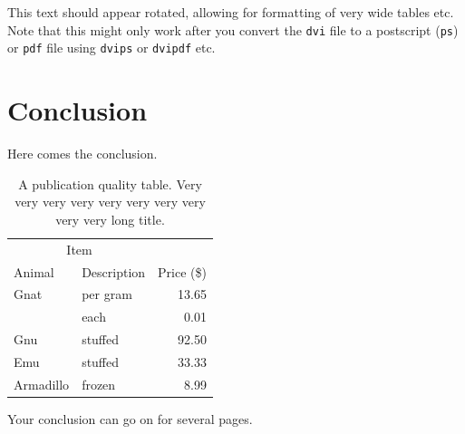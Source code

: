 \documentclass[msc,oneside]{ubcthesis}%
\begin{document}
\begin{landscape}
  This text should appear rotated, allowing for formatting of very
  wide tables etc.  Note that this might only work after you convert
  the \texttt{dvi} file to a postscript (\texttt{ps}) or \texttt{pdf}
  file using \texttt{dvips} or \texttt{dvipdf} etc.
\end{landscape}

\chapter{Conclusion}
Here comes the conclusion.
\begin{table}[tbph]
\centering
\caption{A publication quality table. Very very very very very very very very very very long title.
\label{table:food1}}
\begin{tabular}{@{}llr@{}} \toprule 
\multicolumn{2}{c}{Item} \\ \cmidrule(r){1-2} 
Animal & Description & Price (\$)\\ \midrule 
Gnat & per gram & 13.65 \\ 
& each & 0.01 \\ 
Gnu & stuffed & 92.50 \\ 
Emu & stuffed & 33.33 \\ 
Armadillo & frozen & 8.99 \\ \bottomrule 
\end{tabular}
\end{table}

\newpage
Your conclusion can go on for several pages.


%


\newpage %
\pagestyle{fancy}\rhead{}\cfoot{}\rfoot{\thepage}


%

\newpage
\pagestyle{headings}

\appendix 
\addappheadtotoc %
\appendixpage 
\end{document}
